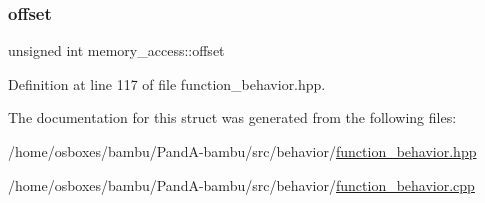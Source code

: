 \mbox{\label{structmemory__access_a1201bfcc141350e99df9bd0bb7a5bb42}} 
\subsubsection{\texorpdfstring{offset}{offset}}
{\footnotesize\ttfamily unsigned int memory\+\_\+access\+::offset}



Definition at line 117 of file function\+\_\+behavior.\+hpp.



The documentation for this struct was generated from the following files\+:\begin{DoxyCompactItemize}
\item 
/home/osboxes/bambu/\+Pand\+A-\/bambu/src/behavior/\hyperlink{function__behavior_8hpp}{function\+\_\+behavior.\+hpp}\item 
/home/osboxes/bambu/\+Pand\+A-\/bambu/src/behavior/\hyperlink{function__behavior_8cpp}{function\+\_\+behavior.\+cpp}\end{DoxyCompactItemize}
